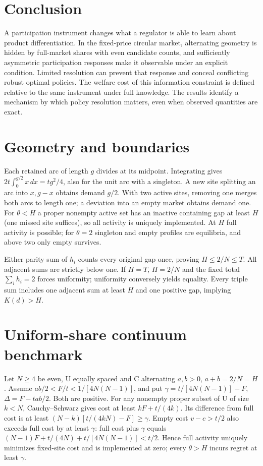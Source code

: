 \documentclass[11pt]{article}
\begin{document}
\section{Conclusion}
A participation instrument changes what a regulator is able to learn about product differentiation. In the fixed-price circular market, alternating geometry is hidden by full-market shares with even candidate counts, and sufficiently asymmetric participation responses make it observable under an explicit condition. Limited resolution can prevent that response and conceal conflicting robust optimal policies. The welfare cost of this information constraint is defined relative to the same instrument under full knowledge. The results identify a mechanism by which policy resolution matters, even when observed quantities are exact.

\appendix
\section{Geometry and boundaries}\label{app:geometry}
Each retained arc of length $g$ divides at its midpoint. Integrating gives $2t\int_0^{g/2}x\,dx=tg^2/4$, also for the unit arc with a singleton. A new site splitting an arc into $x,g-x$ obtains demand $g/2$. With two active sites, removing one merges both arcs to length one; a deviation into an empty market obtains demand one. For $\theta<H$ a proper nonempty active set has an inactive containing gap at least $H$ (one missed site suffices), so all activity is uniquely implemented. At $H$ full activity is possible; for $\theta=2$ singleton and empty profiles are equilibria, and above two only empty survives.

Either parity sum of $h_i$ counts every original gap once, proving $H\leq2/N\leq T$. All adjacent sums are strictly below one. If $H=T$, $H=2/N$ and the fixed total $\sum_i h_i=2$ forces uniformity; uniformity conversely yields equality. Every triple sum includes one adjacent sum at least $H$ and one positive gap, implying $K(d)>H$.

\section{Uniform-share continuum benchmark}\label{app:uniform}
Let $N\geq4$ be even, U equally spaced and C alternating $a,b>0$, $a+b=2/N=H$. Assume $ab/2<F/t<1/[4N(N-1)]$, and put $\gamma=t/[4N(N-1)]-F$, $\Delta=F-tab/2$. Both are positive. For any nonempty proper subset of U of size $k<N$, Cauchy--Schwarz gives cost at least $kF+t/(4k)$. Its difference from full cost is at least $(N-k)[t/(4kN)-F]\geq\gamma$. Empty cost $v-c>t/2$ also exceeds full cost by at least $\gamma$: full cost plus $\gamma$ equals $(N-1)F+t/(4N)+t/[4N(N-1)]<t/2$. Hence full activity uniquely minimizes fixed-site cost and is implemented at zero; every $\theta>H$ incurs regret at least $\gamma$.
\end{document}
